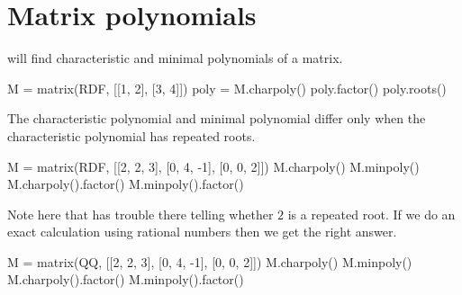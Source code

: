 





\section{Matrix polynomials}

\Sage{} will find characteristic and minimal polynomials of a matrix.
\begin{sageoutput}
M =  matrix(RDF, [[1, 2], [3, 4]]) 
poly = M.charpoly()
poly.factor()
poly.roots()
\end{sageoutput}

The characteristic polynomial and minimal polynomial differ only when 
the characteristic polynomial has repeated roots.
\begin{sageoutput}
M =  matrix(RDF, [[2, 2, 3], [0, 4, -1], [0, 0, 2]]) 
M.charpoly()
M.minpoly()
M.charpoly().factor()
M.minpoly().factor()
\end{sageoutput}
\noindent
Note here that \Sage{} has trouble there telling whether $2$ is a repeated 
root.
If we do an exact calculation using 
rational numbers then we get the right answer.  
\begin{sageoutput}
M =  matrix(QQ, [[2, 2, 3], [0, 4, -1], [0, 0, 2]]) 
M.charpoly()
M.minpoly()
M.charpoly().factor()
M.minpoly().factor()
\end{sageoutput}





